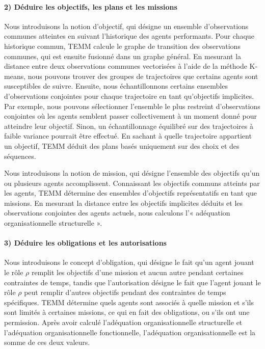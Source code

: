 \paragraph{\textbf{2) Déduire les objectifs, les plans et les missions}}

Nous introduisons la notion d'objectif, qui désigne un ensemble d'observations communes atteintes en suivant l'historique des agents performants.
Pour chaque historique commun, TEMM calcule le graphe de transition des observations communes, qui est ensuite fusionné dans un graphe général. En mesurant la distance entre deux observations communes vectorisées à l'aide de la méthode K-means, nous pouvons trouver des groupes de trajectoires que certains agents sont susceptibles de suivre. Ensuite, nous échantillonnons certains ensembles d'observations conjointes pour chaque trajectoire en tant qu'objectifs implicites. Par exemple, nous pouvons sélectionner l'ensemble le plus restreint d'observations conjointes où les agents semblent passer collectivement à un moment donné pour atteindre leur objectif. Sinon, un échantillonnage équilibré sur des trajectoires à faible variance pourrait être effectué. En sachant à quelle trajectoire appartient un objectif, TEMM déduit des plans basés uniquement sur des choix et des séquences.

Nous introduisons la notion de mission, qui désigne l'ensemble des objectifs qu'un ou plusieurs agents accomplissent.
Connaissant les objectifs communs atteints par les agents, TEMM détermine des ensembles d'objectifs représentatifs en tant que missions.
En mesurant la distance entre les objectifs implicites déduits et les observations conjointes des agents actuels, nous calculons l'« adéquation organisationnelle structurelle ».

\paragraph{\textbf{3) Déduire les obligations et les autorisations}}

Nous introduisons le concept d'obligation, qui désigne le fait qu'un agent jouant le rôle $\rho$ remplit les objectifs d'une mission et aucun autre pendant certaines contraintes de temps, tandis que l'autorisation désigne le fait que l'agent jouant le rôle $\rho$ peut remplir d'autres objectifs pendant des contraintes de temps spécifiques.
TEMM détermine quels agents sont associés à quelle mission et s'ils sont limités à certaines missions, ce qui en fait des obligations, ou s'ils ont une permission.
Après avoir calculé l'adéquation organisationnelle structurelle et l'adéquation organisationnelle fonctionnelle, l'adéquation organisationnelle est la somme de ces deux valeurs.


